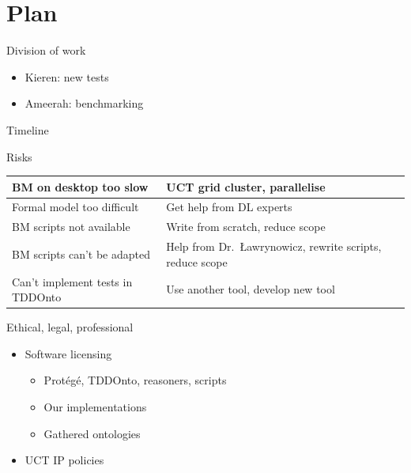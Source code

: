 \documentclass[17pt,mathserif]{beamer}
\begin{document}
\section{Plan}

\begin{frame}{Division of work}
  \begin{itemize}
    \item Kieren: new tests
    \item Ameerah: benchmarking
  \end{itemize}
\end{frame}

\begin{frame}{Timeline}
  \resizebox{\textwidth}{!}{}
\end{frame}

\begin{frame}{Risks}
  \footnotesize
  \renewcommand{\arraystretch}{2}
  \begin{tabular}{@{}>{\raggedright}p{}>{\raggedright\arraybackslash}p{}@{}}
    BM on desktop too slow &
    UCT grid cluster, parallelise \\ \hline
    Formal model too difficult &
    Get help from DL experts \\ \hline
    BM scripts not available &
    Write from scratch, reduce scope \\ \hline
    BM scripts can't be adapted &
    Help from Dr.\ {\L}awrynowicz, rewrite scripts, reduce scope \\ \hline
    Can't implement tests in {TDDOnto} &
    Use another tool, develop new tool
  \end{tabular}
\end{frame}

\begin{frame}{Ethical, legal, professional}
  \begin{itemize}
    \item Software licensing
    \begin{itemize}
      \item Prot\'eg\'e, TDDOnto, reasoners, scripts
      \item Our implementations
      \item Gathered ontologies
    \end{itemize}
    \item UCT IP policies
  \end{itemize}
\end{frame}
\end{document}
